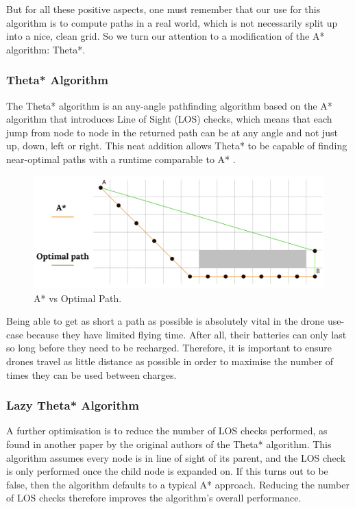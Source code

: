 \documentclass[a4paper,12pt,titlepage]{article}
\begin{document}
But for all these positive aspects, one must remember that our use for this algorithm is to compute paths in a real world, which is not necessarily split up into a nice, clean grid. So we turn our attention to a modification of the A* algorithm: Theta*.

\subsubsection{Theta* Algorithm}
The Theta* algorithm is an any-angle pathfinding algorithm based on the A* algorithm that introduces Line of Sight (LOS) checks, which means that each jump from node to node in the returned path can be at any angle and not just up, down, left or right. This neat addition allows Theta* to be capable of finding near-optimal paths with a runtime comparable to A* \cite{Uras2015}. \\

\begin{figure}[!hbpt]
  \center
  \includegraphics[width=\linewidth]{img/a_star_vs_optimal.png}
  \caption{A* vs Optimal Path. \cite{Balaji2017}}
  \label{fig:a_star_vs_optimal}
\end{figure}

Being able to get as short a path as possible is absolutely vital in the drone use-case because they have limited flying time. After all, their batteries can only last so long before they need to be recharged. Therefore, it is important to ensure drones travel as little distance as possible in order to maximise the number of times they can be used between charges.

\newpage
\subsubsection{Lazy Theta* Algorithm}
A further optimisation is to reduce the number of LOS checks performed, as found in another paper by the original authors of the Theta* algorithm\cite{Nash2010}. This algorithm assumes every node is in line of sight of its parent, and the LOS check is only performed once the child node is expanded on. If this turns out to be false, then the algorithm defaults to a typical A* approach. Reducing the number of LOS checks therefore improves the algorithm's overall performance.
\end{document}
